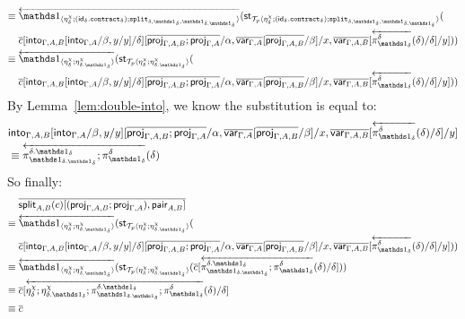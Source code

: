 \documentclass[10pt]{article}
\theoremstyle{definition}
\newcommand{\id}{\mathsf{id}}
\newcommand{\rewrite}[2]{\overleftarrow{#1}(#2)}
\newcommand\StI[2]{\ensuremath{\mathsf{st}_{#1}(#2)}}
\newcommand\ApEl[2]{\mathcal{T}_{#1}\langle#2\rangle}
\newcommand\bdot[0]{\mathbin{.}}
\begin{document}
\begin{enumerate}[style = multiline, labelwidth = 80pt]
\begin{align*}
\equiv{} &\rewrite{\ApOne{\eta^\chi_\delta;(\id_\delta \bdot \contract{\delta});\tsplit{\delta,\One_\delta,\One_{\delta.\One_\delta}}}}{\StI{\ApEl{p}{\eta^\chi_\delta;(\id_\delta \bdot \contract{\delta});\tsplit{\delta,\One_\delta,\One_{\delta.\One_\delta}}}}{\\&\upstairs{c}[\into{\Gamma, A, B}[\into{\Gamma, A}/\beta, y/y] /\delta][\upstairs{\proj{\Gamma, A, B};\proj{\Gamma, A}}/\alpha, \upstairs{\qvar{\Gamma, A}}[\upstairs{\proj{\Gamma, A, B}}/\beta]/x, \upstairs{\qvar{\Gamma, A, B}}[\rewrite{\pi^\delta_{\One_\delta}}{\delta}/\delta]/y]}} \\
\equiv{} &\rewrite{\ApOne{\eta^\chi_\delta;\eta^\chi_{\delta.\One_\delta}}}{\StI{\ApEl{p}{\eta^\chi_\delta;\eta^\chi_{\delta.\One_\delta}}}{\\&\upstairs{c}[\into{\Gamma, A, B}[\into{\Gamma, A}/\beta, y/y] /\delta][\upstairs{\proj{\Gamma, A, B};\proj{\Gamma, A}}/\alpha, \upstairs{\qvar{\Gamma, A}}[\upstairs{\proj{\Gamma, A, B}}/\beta]/x, \upstairs{\qvar{\Gamma, A, B}}[\rewrite{\pi^\delta_{\One_\delta}}{\delta}/\delta]/y]}}
\end{align*}
By Lemma~\ref{lem:double-into}, we know the substitution is equal to:
\begin{align*}
&\into{\Gamma, A, B}[\into{\Gamma, A}/\beta, y/y][\upstairs{\proj{\Gamma, A, B};\proj{\Gamma, A}}/\alpha, \upstairs{\qvar{\Gamma, A}}[\upstairs{\proj{\Gamma, A, B}}/\beta]/x, \upstairs{\qvar{\Gamma, A, B}}[\rewrite{\pi^\delta_{\One_\delta}}{\delta}/\delta]/y] \\
&\equiv \rewrite{\pi^{\delta.\One_\delta}_{\One_{\delta.\One_\delta}};\pi^{\delta}_{\One_{\delta}}}{\delta}
\end{align*}
So finally:
\begin{align*}
&\upstairs{\qsplit{A,B}(c)[(\proj{\Gamma, A, B};\proj{\Gamma, A}), \allowbreak\qpair{A,B}]} \\
\equiv{} &\rewrite{\ApOne{\eta^\chi_\delta;\eta^\chi_{\delta.\One_\delta}}}{\StI{\ApEl{p}{\eta^\chi_\delta;\eta^\chi_{\delta.\One_\delta}}}{\\&\upstairs{c}[\into{\Gamma, A, B}[\into{\Gamma, A}/\beta, y/y] /\delta][\upstairs{\proj{\Gamma, A, B};\proj{\Gamma, A}}/\alpha, \upstairs{\qvar{\Gamma, A}}[\upstairs{\proj{\Gamma, A, B}}/\beta]/x, \upstairs{\qvar{\Gamma, A, B}}[\rewrite{\pi^\delta_{\One_\delta}}{\delta}/\delta]/y]}} \\
\equiv{} &\rewrite{\ApOne{\eta^\chi_\delta;\eta^\chi_{\delta.\One_\delta}}}{\StI{\ApEl{p}{\eta^\chi_\delta;\eta^\chi_{\delta.\One_\delta}}}{\upstairs{c}[\rewrite{\pi^{\delta.\One_\delta}_{\One_{\delta.\One_\delta}};\pi^{\delta}_{\One_{\delta}}}{\delta}/\delta]}} \\
\equiv{} &\upstairs{c}[\rewrite{\eta^\chi_\delta;\eta^\chi_{\delta.\One_\delta};\pi^{\delta.\One_\delta}_{\One_{\delta.\One_\delta}};\pi^{\delta}_{\One_{\delta}}}{\delta}/\delta]\\
\equiv{} &\upstairs{c}
\end{align*}


\end{enumerate}
\end{document}
